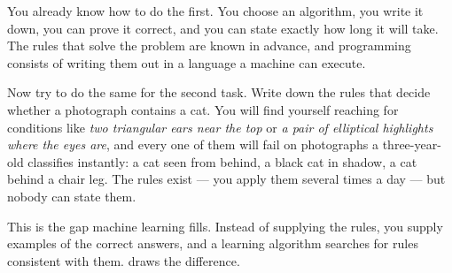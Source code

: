 You already know how to do the first. You choose an algorithm, you write it
down, you can prove it correct, and you can state exactly how long it will take.
The rules that solve the problem are known in advance, and programming consists
of writing them out in a language a machine can execute.

Now try to do the same for the second task. Write down the rules that decide
whether a photograph contains a cat. You will find yourself reaching for
conditions like \emph{two triangular ears near the top} or \emph{a pair of
elliptical highlights where the eyes are}, and every one of them will fail on
photographs a three-year-old classifies instantly: a cat seen from behind, a
black cat in shadow, a cat behind a chair leg. The rules exist --- you apply them
several times a day --- but nobody can state them.

This is the gap machine learning fills. Instead of supplying the rules, you
supply examples of the correct answers, and a learning algorithm searches for
rules consistent with them.  draws the difference.

